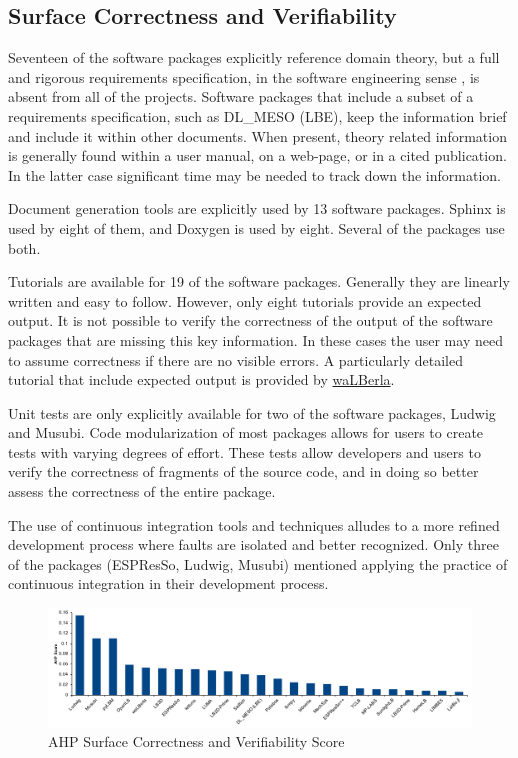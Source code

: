 \documentclass[final, 3p, times, authoryear]{elsarticle}
\begin{document}
\subsection{Surface Correctness and Verifiability} \label{SecSurfCorrectAndVerifiab}

Seventeen of the software packages explicitly reference domain theory, but a
full and rigorous requirements specification, in the software engineering sense
\citep{IEEE1998, RobertsonAndRobertson1999Vol, ESA1991}, is absent from all of
the projects. Software packages that include a subset of a requirements
specification, such as DL\_MESO (LBE), keep the information brief and include it
within other documents. When present, theory related information is generally
found within a user manual, on a web-page, or in a cited publication. In the
latter case significant time may be needed to track down the information.

Document generation tools are explicitly used by 13 software packages. Sphinx is
used by eight of them, and Doxygen is used by eight. Several of the packages use
both.

Tutorials are available for 19 of the software packages. Generally they are
linearly written and easy to follow. However, only eight tutorials provide an
expected output. It is not possible to verify the correctness of the output of
the software packages that are missing this key information. In these cases the
user may need to assume correctness if there are no visible errors.  A
particularly  detailed tutorial that include expected output is provided by
\href{https://www.walberla.net/doxygen/index.html} {waLBerla}.

Unit tests are only explicitly available for two of the software packages,
Ludwig and Musubi. Code modularization of most packages allows for users to
create tests with varying degrees of effort. These tests allow developers and
users to verify the correctness of fragments of the source code, and in doing so
better assess the correctness of the entire package.

The use of continuous integration tools and techniques alludes to a more refined
development process where faults are isolated and better recognized. Only three
of the packages (ESPResSo, Ludwig, Musubi) mentioned applying the practice of
continuous integration in their development process.

\begin{figure}[h!]
	\begin{center}
		\includegraphics[width=1.0\textwidth]{./figures/correctnessverifiability.pdf}
		\caption{AHP Surface Correctness and Verifiability Score}
		\label{Fig_CorrectnessVerifiability}
	\end{center}
\end{figure}
\end{document}
